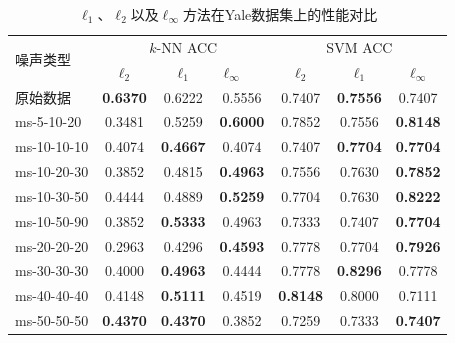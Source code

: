     \begin{table}[!t]
        \vspace{-1em}
        \caption{\mbox{$\ell_{1}$、$\ell_{2}$以及$\ell_{\infty}$方法在Yale数据集上的性能对比}}
        \label{tab:yale}
        \centering
        \begin{tabular}{lcccccc}
    \hline
    \multirow{2}{*}{噪声类型} & \multicolumn{3}{c}{$k$-NN ACC}                                                                          & \multicolumn{3}{c}{SVM ACC}                                                    \\ \cline{2-7}
                           & $\ell_2$                         & $\ell_1$                         & \multicolumn{1}{l}{$\ell_\infty$} & $\ell_2$ & $\ell_1$                         & $\ell_\infty$                    \\ \hline
    原始数据               & \textbf{0.6370} & 0.6222                           & 0.5556                            & 0.7407   & \textbf{0.7556} & 0.7407                           \\
    ms-5-10-20 & 0.3481 & 0.5259 & \textbf{0.6000} & 0.7852 & 0.7556 & \textbf{0.8148} \\
    ms-10-10-10 & 0.4074 & \textbf{0.4667} & 0.4074 & 0.7407 & \textbf{0.7704} & \textbf{0.7704} \\
    ms-10-20-30 & 0.3852 & 0.4815 & \textbf{0.4963} & 0.7556 & 0.7630 & \textbf{0.7852} \\
    ms-10-30-50 & 0.4444 & 0.4889 & \textbf{0.5259} & 0.7704 & 0.7630 & \textbf{0.8222} \\
    ms-10-50-90 & 0.3852 & \textbf{0.5333} & 0.4963 & 0.7333 & 0.7407 & \textbf{0.7704} \\
    ms-20-20-20 & 0.2963 & 0.4296 & \textbf{0.4593} & 0.7778 & 0.7704 & \textbf{0.7926} \\
    ms-30-30-30 & 0.4000 & \textbf{0.4963} & 0.4444 & 0.7778 & \textbf{0.8296} & 0.7778 \\
    ms-40-40-40 & 0.4148 & \textbf{0.5111} & 0.4519 & \textbf{0.8148} & 0.8000 & 0.7111 \\
    ms-50-50-50 & \textbf{0.4370} & \textbf{0.4370} & 0.3852 & 0.7259 & 0.7333 & \textbf{0.7407} \\
    \hline\hline

\end{tabular}
\end{table}
